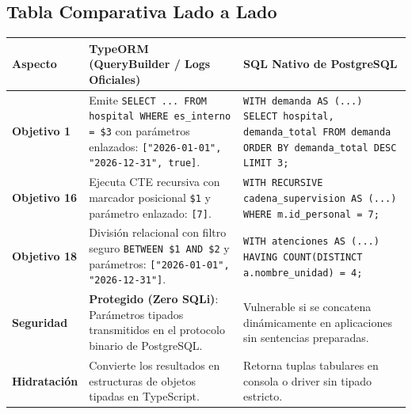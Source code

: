 \documentclass[11pt,a4paper]{article}
\begin{document}
\subsection{Tabla Comparativa Lado a Lado}
\begin{table}[H]
\centering
\scriptsize
\begin{tabularx}{\linewidth}{|l|X|X|}
\hline
\textbf{Aspecto} & \textbf{TypeORM (QueryBuilder / Logs Oficiales)} & \textbf{SQL Nativo de PostgreSQL} \\
\hline
\textbf{Objetivo 1} & Emite \texttt{SELECT ... FROM hospital WHERE es\_interno = \$3} con parámetros enlazados: \texttt{["2026-01-01", "2026-12-31", true]}. & \texttt{WITH demanda AS (...) SELECT hospital, demanda\_total FROM demanda ORDER BY demanda\_total DESC LIMIT 3;} \\
\hline
\textbf{Objetivo 16} & Ejecuta CTE recursiva con marcador posicional \texttt{\$1} y parámetro enlazado: \texttt{[7]}. & \texttt{WITH RECURSIVE cadena\_supervision AS (...) WHERE m.id\_personal = 7;} \\
\hline
\textbf{Objetivo 18} & División relacional con filtro seguro \texttt{BETWEEN \$1 AND \$2} y parámetros: \texttt{["2026-01-01", "2026-12-31"]}. & \texttt{WITH atenciones AS (...) HAVING COUNT(DISTINCT a.nombre\_unidad) = 4;} \\
\hline
\textbf{Seguridad} & \textbf{Protegido (Zero SQLi)}: Parámetros tipados transmitidos en el protocolo binario de PostgreSQL. & Vulnerable si se concatena dinámicamente en aplicaciones sin sentencias preparadas. \\
\hline
\textbf{Hidratación} & Convierte los resultados en estructuras de objetos tipadas en TypeScript. & Retorna tuplas tabulares en consola o driver sin tipado estricto. \\
\hline
\end{tabularx}
\end{table}
\end{document}
